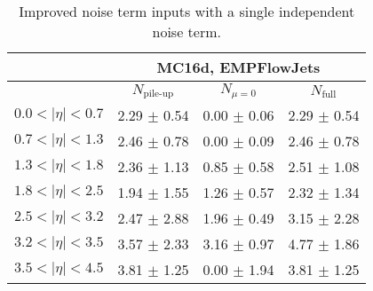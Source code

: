 \begin{table}[t]
{        \begin{tabular}{ l | c  c  c }
                                 & \multicolumn{3}{|c}{MC16d, EMPFlowJets}\tabularnewline
            \hline
                                 & $N_{\text{pile-up}}$                                   & $N_{\mu = 0}$   & $N_{\text{full}}$\tabularnewline
            \hline
            $0.0 < |\eta| < 0.7$ & 2.29 $\pm$ 0.54                                        & 0.00 $\pm$ 0.06 & 2.29 $\pm$ 0.54\tabularnewline
            \hline
            $0.7 < |\eta| < 1.3$ & 2.46 $\pm$ 0.78                                        & 0.00 $\pm$ 0.09 & 2.46 $\pm$ 0.78\tabularnewline
            \hline
            $1.3 < |\eta| < 1.8$ & 2.36 $\pm$ 1.13                                        & 0.85 $\pm$ 0.58 & 2.51 $\pm$ 1.08\tabularnewline
            \hline
            $1.8 < |\eta| < 2.5$ & 1.94 $\pm$ 1.55                                        & 1.26 $\pm$ 0.57 & 2.32 $\pm$ 1.34\tabularnewline
            \hline
            $2.5 < |\eta| < 3.2$ & 2.47 $\pm$ 2.88                                        & 1.96 $\pm$ 0.49 & 3.15 $\pm$ 2.28\tabularnewline
            \hline
            $3.2 < |\eta| < 3.5$ & 3.57 $\pm$ 2.33                                        & 3.16 $\pm$ 0.97 & 4.77 $\pm$ 1.86\tabularnewline
            \hline
            $3.5 < |\eta| < 4.5$ & 3.81 $\pm$ 1.25                                        & 0.00 $\pm$ 1.94 & 3.81 $\pm$ 1.25
        \end{tabular}
    }    
    \caption{
        Improved noise term inputs with a single \pT independent noise term.}
    \label{tab:improved-noise-term-inputs}
\end{table}